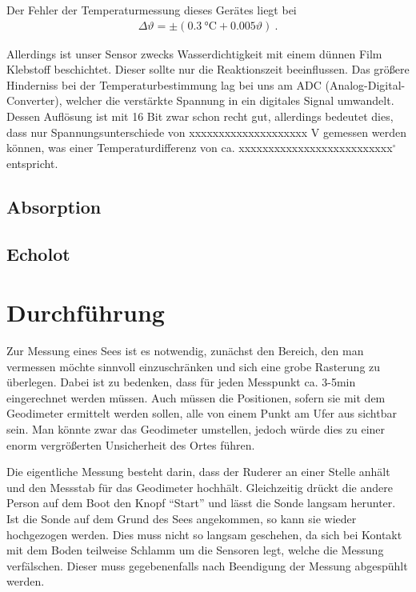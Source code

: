 \documentclass[12pt,a4paper,titlepage,headinclude,bibtotoc]{scrartcl}
\begin{document}
Der Fehler der Temperaturmessung dieses Gerätes liegt bei
\begin{align}
	\Delta\vartheta=\pm (0.3~\si{\celsius}+0.005\vartheta)~.
	\label{eq:Pt1000_fehler}
\end{align}

Allerdings ist unser Sensor zwecks Wasserdichtigkeit mit einem dünnen Film Klebstoff beschichtet.
Dieser sollte nur die Reaktionszeit beeinflussen.
Das größere Hinderniss bei der Temperaturbestimmung lag bei uns am ADC (Analog-Digital-Converter), welcher die verstärkte Spannung in ein digitales Signal umwandelt.
Dessen Auflösung ist mit 16 Bit zwar schon recht gut, allerdings bedeutet dies, dass nur Spannungsunterschiede von xxxxxxxxxxxxxxxxxxxx V gemessen werden können, was einer Temperaturdifferenz von ca. xxxxxxxxxxxxxxxxxxxxxxxxxx$^\circ$ entspricht.


\subsection{Absorption}

\subsection{Echolot}
                                                                                                                                                                      
\section{Durchführung}
\label{sec:durchfuehrung}
Zur Messung eines Sees ist es notwendig, zunächst den Bereich, den man vermessen möchte sinnvoll einzuschränken und sich eine grobe Rasterung zu überlegen.
Dabei ist zu bedenken, dass für jeden Messpunkt ca. 3-5min eingerechnet werden müssen.
Auch müssen die Positionen, sofern sie mit dem Geodimeter ermittelt werden sollen, alle von einem Punkt am Ufer aus sichtbar sein.
Man könnte zwar das Geodimeter umstellen, jedoch würde dies zu einer enorm vergrößerten Unsicherheit des Ortes führen.

Die eigentliche Messung besteht darin, dass der Ruderer an einer Stelle anhält und den Messstab für das Geodimeter hochhält.
Gleichzeitig drückt die andere Person auf dem Boot den Knopf "`Start"' und lässt die Sonde langsam herunter.
Ist die Sonde auf dem Grund des Sees angekommen, so kann sie wieder hochgezogen werden.
Dies muss nicht so langsam geschehen, da sich bei Kontakt mit dem Boden teilweise Schlamm um die Sensoren legt, welche die Messung verfälschen.
Dieser muss gegebenenfalls nach Beendigung der Messung abgespühlt werden.
\end{document}
